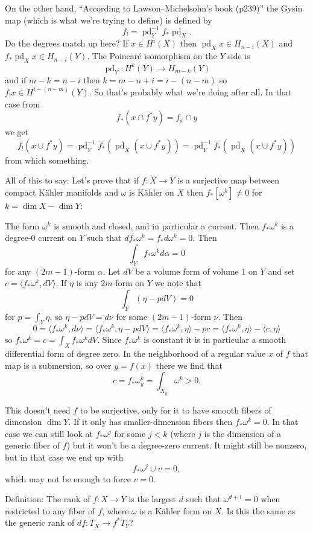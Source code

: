 \documentclass[11pt]{amsart}
\theoremstyle{definition}
\def\pd{\operatorname{pd}}
\def\<{\langle}
\def\>{\rangle}
\begin{document}
On the other hand, ``According to Lawson--Michelsohn's book (p239)'' the Gysin map (which is what we're trying to define) is defined by
\[
f_! = \pd_Y^{-1} f_* \pd_X.
\]
Do the degrees match up here?
If $x \in H^i(X)$ then $\pd_X x \in H_{n-i}(X)$ and $f_* \pd_X x \in H_{n-i}(Y)$.
The Poincar\'e isomorphism on the $Y$ side is
\[
\pd_Y : H^k(Y) \to H_{m-k}(Y)
\]
and if $m - k = n - i$ then $k = m - n + i = i - (n-m)$ so $f_!x \in H^{i-(n-m)}(Y)$.
So that's probably what we're doing after all.
In that case from
\[
f_*(x \cap f^*y) = f_x \cap y
\]
we get
\[
f_!(x \cup f^*y)
= \pd_Y^{-1} f_*(\pd_X(x \cup f^*y))
= \pd_Y^{-1} f_*(\pd_X(x \cup f^*y))
\]
from which something.


All of this to say:
Let's prove that if $f : X \to Y$ is a surjective map between compact K\"ahler manifolds and $\omega$ is K\"ahler on $X$ then $f_*[\omega^k] \not= 0$ for $k = \dim X - \dim Y$:

The form $\omega^k$ is smooth and closed, and in particular a current.
Then $f_* \omega^k$ is a degree-$0$ current on $Y$ such that $d f_* \omega^k = f_* d\omega^k = 0$.
Then
\[
\int_Y f_* \omega^k d\alpha = 0
\]
for any $(2m-1)$-form $\alpha$.
Let $dV$ be a volume form of volume 1 on $Y$ and set $c = \< f_*\omega^k, dV \>$.
If $\eta$ is any $2m$-form on $Y$ we note that 
\[
\int_Y (\eta - p dV) = 0
\]
for $p = \int_Y \eta$, so $\eta - pdV = d \nu$ for some $(2m-1)$-form $\nu$.
Then
\[
0 
= \< f_*\omega^k, d\nu \>
= \<f_*\omega^k, \eta - pdV\>
= \<f_*\omega^k, \eta \> - pc
= \<f_*\omega^k, \eta \> - \< c, \eta \> 
\]
so $f_*\omega^k = c = \int_X f_*\omega^k dV$.
Since $f_*\omega^k$ is constant it is in particular a smooth differential form of degree zero.
In the neighborhood of a regular value $x$ of $f$ that map is a submersion, so over $y = f(x)$ there we find that
\[
c = f_* \omega^k_y
= \int_{X_y} \omega^k > 0.
\]

This doesn't need $f$ to be surjective, only for it to have smooth fibers of dimension $\dim Y$.
If it only has smaller-dimension fibers then $f_*\omega^k = 0$.
In that case we can still look at $f_*\omega^j$ for some $j < k$ (where $j$ is the dimension of a generic fiber of $f$) but it won't be a degree-zero current.
It might still be nonzero, but in that case we end up with
\[
f_* \omega^j \cup v = 0,
\]
which may not be enough to force $v = 0$.

Definition: The rank of $f : X \to Y$ is the largest $d$ such that $\omega^{d+1} = 0$ when restricted to any fiber of $f$, where $\omega$ is a K\"ahler form on $X$.
Is this the same as the generic rank of $df : T_X \to f^*T_Y$?
\end{document}
